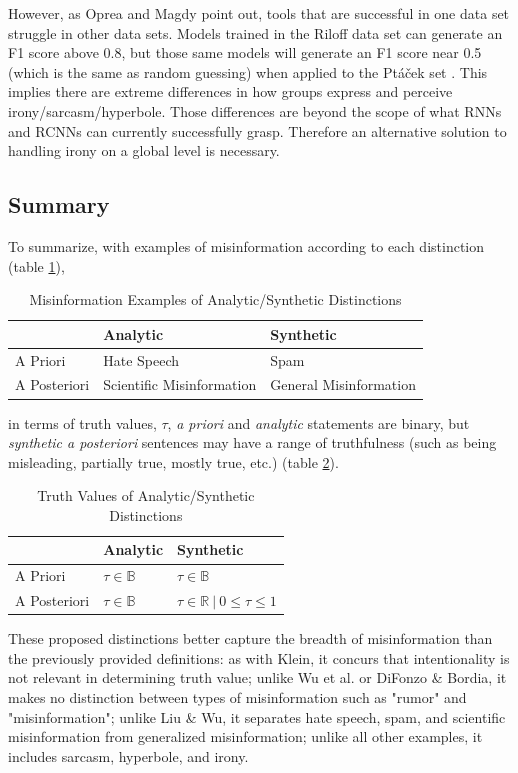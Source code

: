 \documentclass[preprint,review,12pt]{elsarticle}
\begin{document}
However, as Oprea and Magdy point out, tools that are successful in one data set struggle in other data sets. Models trained in the Riloff data set can generate an F1 score above 0.8, but those same models will generate an F1 score near 0.5 (which is the same as random guessing) when applied to the Pt{\'a}{\v{c}}ek set \cite{oprea2019exploring}. This implies there are extreme differences in how groups express and perceive irony/sarcasm/hyperbole. Those differences are beyond the scope of what RNNs and RCNNs can currently successfully grasp. Therefore an alternative solution to handling irony on a global level is necessary.
\subsection{Summary}
\label{truthvalueappendixsummary}
To summarize, with examples of misinformation according to each distinction (table \ref{tab:misinformationexamples}),
\begin{table}[htbp]
    \centering
    \begin{tabular}{ |p{3cm}|p{5cm}|p{5cm}|}
    \hline
    & Analytic & Synthetic\\
    \hline
    A Priori & Hate Speech & Spam\\
    \hline
    A Posteriori &  Scientific Misinformation  & General Misinformation\\
    \hline
    \end{tabular}
    \caption{Misinformation Examples of Analytic/Synthetic Distinctions}
    \label{tab:misinformationexamples}
\end{table}
in terms of truth values, $\tau$, \textit{a priori} and \textit{analytic} statements are binary, but \textit{synthetic a posteriori} sentences may have a range of truthfulness (such as being misleading, partially true, mostly true, etc.) (table \ref{tab:truthvalues}).

\begin{table}[h!]
\centering
\begin{tabular}{ |p{3cm}|p{5cm}|p{5cm}|}
 \hline
  & Analytic & Synthetic\\
 \hline
 A Priori & $\tau \in \mathbb{B}$ & $\tau \in \mathbb{B}$\\
 \hline
 A Posteriori &  $\tau \in \mathbb{B}$  & $\tau \in \mathbb{R} \ | \ 0 \leq \tau \leq 1$ \\
 \hline
\end{tabular}
\caption{Truth Values of Analytic/Synthetic Distinctions}
\label{tab:truthvalues}
\end{table}

These proposed distinctions better capture the breadth of misinformation than the previously provided definitions: as with Klein, it concurs that intentionality is not relevant in determining truth value; unlike Wu et al. or DiFonzo \& Bordia, it makes no distinction between types of misinformation such as "rumor" and "misinformation"; unlike Liu \& Wu, it separates hate speech, spam, and scientific misinformation from generalized misinformation; unlike all other examples, it includes sarcasm, hyperbole, and irony. 

\newpage
 

\end{document}
